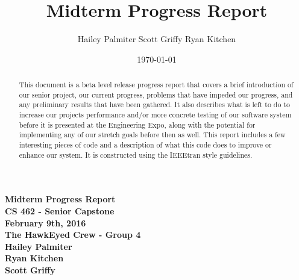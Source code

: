 \documentclass[letterpaper,10pt,titlepage]{IEEEtran}
\title{Midterm Progress Report}
\author{Hailey Palmiter Scott Griffy Ryan Kitchen}
\date{\today}
\begin{document}
   \begin{titlepage}
      \centering
      \vfill
      {\bfseries\Large
         Midterm Progress Report \\
         CS 462 - Senior Capstone\\
         \vskip2cm
         February 9th, 2016\\
         \vskip2cm
         The HawkEyed Crew - Group 4\\ 
         \vskip1cm
         Hailey Palmiter\\
         \vskip1cm
         Ryan Kitchen\\
         \vskip1cm
         Scott Griffy\\
    
      }
      \vfill
      \vskip2cm
      \begin{abstract}
      This document is a beta level release progress report that covers a brief introduction of our senior project, our current progress, problems that have impeded our progress, and any preliminary results that have been gathered. It also describes what is left to do to increase our projects performance and/or more concrete testing of our software system before it is presented at the Engineering Expo, along with the potential for implementing any of our stretch goals before then as well. This report includes a few interesting pieces of code and a description of what this code does to improve or enhance our system. It is constructed using the IEEEtran style guidelines.
      \end{abstract}
      \vfill
   \end{titlepage}
   
   \onecolumn
   \tableofcontents
   \newpage
   \bigskip
\end{document}
